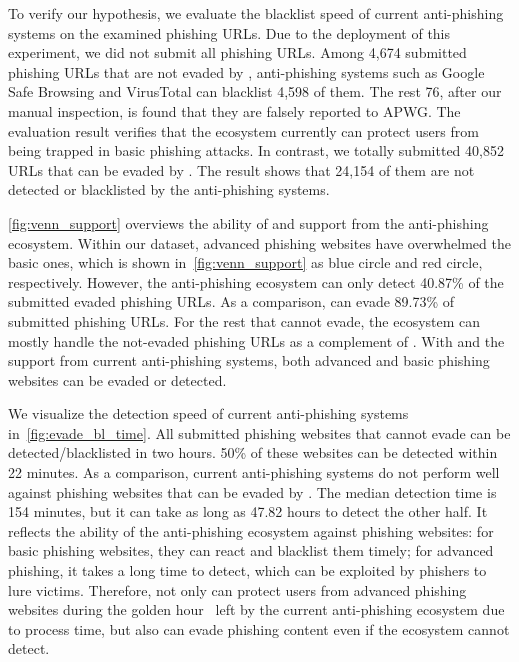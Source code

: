 To verify our hypothesis, we evaluate the blacklist speed of current anti-phishing systems on the examined phishing URLs.
Due to the deployment of this experiment, we did not submit all phishing URLs.
Among 4,674 submitted phishing URLs that are not evaded by \spartacus, anti-phishing systems such as Google Safe Browsing and VirusTotal can blacklist 4,598 of them.
The rest 76, after our manual inspection, is found that they are falsely reported to APWG.
The evaluation result verifies that the ecosystem currently can protect users from being trapped in basic phishing attacks.
In contrast, we totally submitted 40,852 URLs that can be evaded by \spartacus.
The result shows that 24,154 of them are not detected or blacklisted by the anti-phishing systems.



\autoref{fig:venn_support} overviews the ability of \spartacus and support from the anti-phishing ecosystem.
Within our dataset, advanced phishing websites have overwhelmed the basic ones, which is shown in~\autoref{fig:venn_support} as blue circle and red circle, respectively.
However, the anti-phishing ecosystem can only detect 40.87\% of the submitted evaded phishing URLs.
As a comparison, \spartacus can evade 89.73\% of submitted phishing URLs.
For the rest that \spartacus cannot evade,
the ecosystem can mostly handle the not-evaded phishing URLs as a complement of \spartacus.
With \spartacus and the support from current anti-phishing systems, 
both advanced and basic phishing websites can be evaded or detected.

We visualize the detection speed of current anti-phishing systems in~\autoref{fig:evade_bl_time}.
All submitted phishing websites that \spartacus cannot evade can be detected/blacklisted in two hours.
50\% of these websites can be detected within 22 minutes.
As a comparison, current anti-phishing systems do not perform well against phishing websites that can be evaded by \spartacus.
The median detection time is 154 minutes, but it can take as long as 47.82 hours to detect the other half.
It reflects the ability of the anti-phishing ecosystem against phishing websites: 
for basic phishing websites, they can react and blacklist them timely;
for advanced phishing, it takes a long time to detect, which can be exploited by phishers to lure victims.
Therefore, \spartacus not only can protect users from advanced phishing websites during the golden hour~\cite{oest2020sunrise} left by the current anti-phishing ecosystem due to process time, but also can evade phishing content even if the ecosystem cannot detect.


